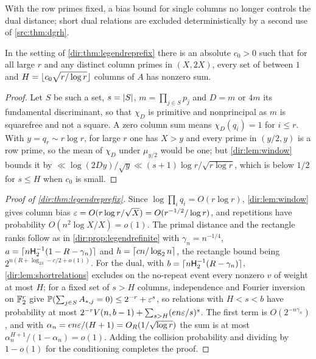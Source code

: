 With the row primes fixed, a bias bound for single columns no longer controls the dual distance; short dual
relations are excluded deterministically by a second use of \cref{src:thm:dgrh}.

\begin{lemma}\label{dir:lem:shortrelations}
In the setting of \cref{dir:thm:legendreprefix} there is an absolute $c_0>0$ such that for all large $r$ and any
distinct column primes in $(X,2X)$, every set of between $1$ and $H=\lfloor c_0\sqrt{r/\log r}\rfloor$ columns of $A$ has
nonzero sum.
\end{lemma}

\begin{proof}
Let $S$ be such a set, $s=\lvert S\rvert$, $m=\prod_{j\in S}p_j$ and $D=m$ or $4m$ its fundamental discriminant, so that
$\chi_D$ is primitive and nonprincipal as $m$ is squarefree and not a square. A zero column sum means
$\chi_D(q_i)=1$ for $i\le r$. With $y=q_r\sim r\log r$, for large $r$ one has $X>y$ and every prime in $(y/2,y)$ is a
row prime, so the mean of $\chi_D$ under $\mu_{y/2}$ would be one; but \cref{dir:lem:window} bounds it by
$\ll\log(2Dy)/\sqrt y\ll(s+1)\log r/\sqrt{r\log r}$, which is below $1/2$ for $s\le H$ when $c_0$ is small.
\end{proof}

\begin{proof}[Proof of \cref{dir:thm:legendreprefix}]
Since $\log\prod_iq_i=O(r\log r)$, \cref{dir:lem:window} gives column bias $\varepsilon=O(r\log r/\sqrt X)=O(r^{-1/2}/\log r)$,
and repetitions have probability $O(n^2\log X/X)=o(1)$. The primal distance and the rectangle ranks follow as in
\cref{dir:prop:legendrefinite} with $\gamma_n=n^{-1/4}$, $a=\lceil n\mathsf H_2^{-1}(1-R-\gamma_n)\rceil$ and
$h=\lceil cn/\log_2n\rceil$, the rectangle bound being $2^{n(R+\log_23-c/2+o(1))}$. For the dual, with
$b=\lceil n\mathsf H_2^{-1}(R-\gamma_n)\rceil$, \cref{dir:lem:shortrelations} excludes on the no-repeat event every nonzero
$v$ of weight at most $H$; for a fixed set of $s>H$ columns, independence and Fourier inversion on $\mathbb{F}_2^r$ give
$\mathbb{P}(\sum_{j\in S}A_{*,j}=0)\le2^{-r}+\varepsilon^s$, so relations with $H<s<b$ have probability at most
$2^{-r}V(n,b-1)+\sum_{s>H}(en\varepsilon/s)^s$. The first term is $O(2^{-n\gamma_n})$, and with
$\alpha_n=en\varepsilon/(H+1)=O_R(1/\sqrt{\log r})$ the sum is at most $\alpha_n^{H+1}/(1-\alpha_n)=o(1)$. Adding the
collision probability and dividing by $1-o(1)$ for the conditioning completes the proof.
\end{proof}

